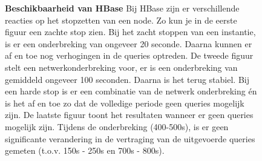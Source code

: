 \begin{figure}[ht!] 
	\centering
	\caption{\textbf{Beschikbaarheid van HBase} \newline 
	Bij HBase zijn er verschillende reacties op het stopzetten van een node. Zo kun je in de eerste figuur een zachte stop zien. Bij het zacht stoppen van een instantie, is er een onderbreking van ongeveer 20 seconde. Daarna kunnen er af en toe nog verhogingen in de queries optreden. \newline
	De tweede figuur stelt een netwerkonderbreking voor, er is een onderbreking van gemiddeld ongeveer 100 seconden. Daarna is het terug stabiel. \newline
	Bij een harde stop is er een combinatie van de netwerk onderbreking én is het af en toe zo dat de volledige periode geen queries mogelijk zijn. De laatste figuur toont het resultaten wanneer er geen queries mogelijk zijn. 	 \newline
	Tijdens de onderbreking (400-500s), is er geen significante verandering in de vertraging van de uitgevoerde queries gemeten (t.o.v. 150s - 250s en 700s - 800s). 
	}
	\label{fig:beschikbaar-hbase-1}
\end{figure}

